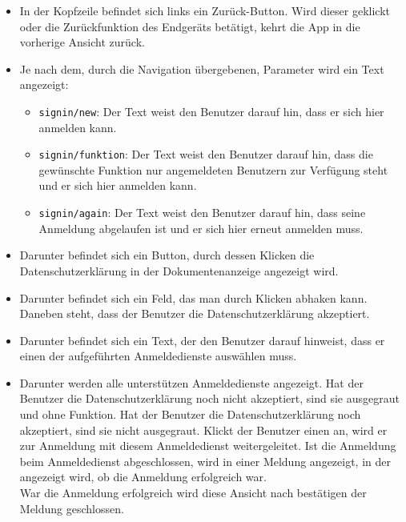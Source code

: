 \begin{itemize}
    \item In der Kopfzeile befindet sich links ein Zurück-Button. Wird dieser geklickt oder die Zurückfunktion 
    des Endgeräts betätigt, kehrt die App in die vorherige Ansicht zurück.
    \item Je nach dem, durch die Navigation übergebenen, Parameter wird ein Text angezeigt:
    \begin{itemize}
        \item \texttt{signin/new}: Der Text weist den Benutzer darauf hin, dass er sich hier anmelden kann.
        \item \texttt{signin/funktion}: Der Text weist den Benutzer darauf hin, dass die gewünschte Funktion nur angemeldeten Benutzern zur Verfügung steht 
        und er sich hier anmelden kann.
        \item \texttt{signin/again}: Der Text weist den Benutzer darauf hin, dass seine Anmeldung abgelaufen ist und er sich hier erneut anmelden muss.
    \end{itemize}
    \item Darunter befindet sich ein Button, durch dessen Klicken die Datenschutzerklärung in der Dokumentenanzeige angezeigt wird.
    \item Darunter befindet sich ein Feld, das man durch Klicken abhaken kann. Daneben steht, dass der Benutzer die Datenschutzerklärung akzeptiert.
    \item Darunter befindet sich ein Text, der den Benutzer darauf hinweist, dass er einen der aufgeführten Anmeldedienste auswählen muss.
    \item Darunter werden alle unterstützen Anmeldedienste angezeigt. Hat der Benutzer die Datenschutzerklärung noch nicht akzeptiert, 
    sind sie ausgegraut und ohne Funktion. Hat der Benutzer die Datenschutzerklärung noch akzeptiert, sind sie nicht ausgegraut. 
    Klickt der Benutzer einen an, wird er zur Anmeldung mit diesem Anmeldedienst weitergeleitet.
    Ist die Anmeldung beim Anmeldedienst abgeschlossen, wird in einer Meldung angezeigt, in der angezeigt wird, ob die Anmeldung erfolgreich war.\\
    War die Anmeldung erfolgreich wird diese Ansicht nach bestätigen der Meldung geschlossen.
\end{itemize}

